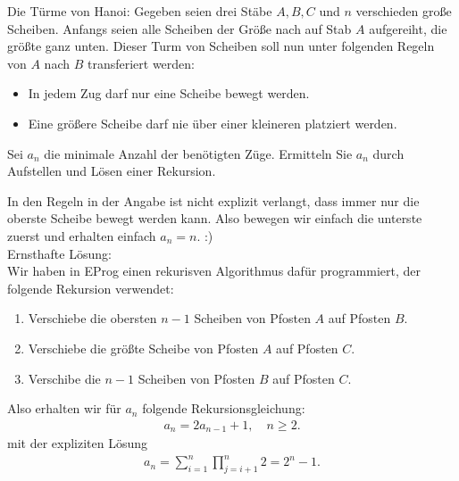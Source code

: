 \begin{exercise}
Die Türme von Hanoi: Gegeben seien drei Stäbe $A,B,C$ und $n$ verschieden große
Scheiben. Anfangs seien alle Scheiben der Größe nach auf Stab $A$ aufgereiht, die
größte ganz unten. Dieser Turm von Scheiben soll nun unter folgenden Regeln von
$A$ nach $B$ transferiert werden:
\begin{itemize}
  \item In jedem Zug darf nur eine Scheibe bewegt werden.
  \item Eine größere Scheibe darf nie über einer kleineren platziert werden.
\end{itemize}
Sei $a_n$ die minimale Anzahl der benötigten Züge. Ermitteln Sie $a_n$ durch
Aufstellen und Lösen einer Rekursion.
\end{exercise}


\begin{solution}
In den Regeln in der Angabe ist nicht explizit verlangt, dass immer nur die
oberste Scheibe bewegt werden kann. Also bewegen wir einfach die unterste
zuerst und erhalten einfach $a_n = n$. :) \\
Ernsthafte Lösung: \\
Wir haben in EProg einen rekurisven Algorithmus dafür programmiert, der
folgende Rekursion verwendet:
\begin{enumerate}
  \item Verschiebe die obersten $n-1$ Scheiben von Pfosten $A$ auf Pfosten $B$.
  \item Verschiebe die größte Scheibe von Pfosten $A$ auf Pfosten $C$.
  \item Verschibe die $n-1$ Scheiben von Pfosten $B$ auf Pfosten $C$.
\end{enumerate}
Also erhalten wir für $a_n$ folgende Rekursionsgleichung:
\begin{align*}
  a_n = 2a_{n-1} + 1, \quad n \geq 2.
\end{align*}
mit der expliziten Lösung
\begin{align*}
  a_n = \sum_{i=1}^n\prod_{j=i+1}^n2 = 2^n - 1.
\end{align*}
\end{solution}

